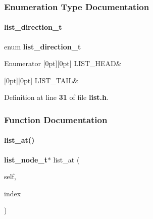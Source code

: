 \subsubsection{Enumeration Type Documentation}
\mbox{\label{list_8h_a2c3af7de0b7ab9c3a84fbc039e75ec66}} 
\paragraph{list\+\_\+direction\+\_\+t}
{\footnotesize\ttfamily enum \textbf{ list\+\_\+direction\+\_\+t}}

\begin{DoxyEnumFields}{Enumerator}
[0pt][0pt]{}\mbox{\label{list_8h_a2c3af7de0b7ab9c3a84fbc039e75ec66abdf0fd732c6a91b57c5cbea177f1ae00}} 
L\+I\+S\+T\+\_\+\+H\+E\+AD&\\
\hline

[0pt][0pt]{}\mbox{\label{list_8h_a2c3af7de0b7ab9c3a84fbc039e75ec66a92ccc72d8839c5167e82e2a7771215ae}} 
L\+I\+S\+T\+\_\+\+T\+A\+IL&\\
\hline

\end{DoxyEnumFields}


Definition at line \textbf{ 31} of file \textbf{ list.\+h}.



\subsubsection{Function Documentation}
\mbox{\label{list_8h_ab3dacc64ceb63b0a0849312b0a14c91c}} 
\paragraph{list\+\_\+at()}
{\footnotesize\ttfamily \textbf{ list\+\_\+node\+\_\+t}$\ast$ list\+\_\+at (\begin{DoxyParamCaption}\item[{\textbf{ list\+\_\+t} $\ast$}]{self,  }\item[{int}]{index }\end{DoxyParamCaption})}



